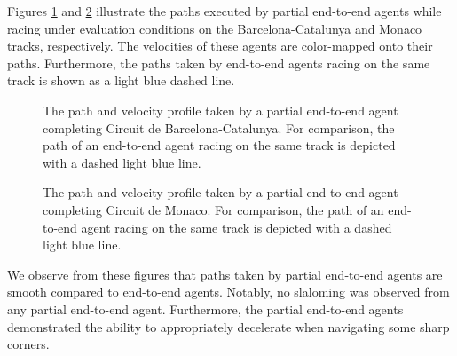 Figures \ref{fig:esp_eval} and \ref{fig:mco_eval} illustrate the paths executed by partial end-to-end agents while racing under evaluation conditions on the Barcelona-Catalunya and Monaco tracks, respectively.
The velocities of these agents are color-mapped onto their paths.
Furthermore, the paths taken by end-to-end agents racing on the same track is shown as a light blue dashed line.
\begin{figure}[htb!]
    \centering
    
    \caption[The path and velocity profile taken by a partial end-to-end agent completing Circuit de Barcelona-Catalunya]{The path and velocity profile taken by a partial end-to-end agent completing Circuit de Barcelona-Catalunya. For comparison, the path of an end-to-end agent racing on the same track is depicted with a dashed light blue line.}
    \label{fig:esp_eval}
\end{figure}
\begin{figure}[htb!]
    \centering
    
    \caption[The path and velocity profile taken by a partial end-to-end agent completing Circuit de Monaco]{The path and velocity profile taken by a partial end-to-end agent completing Circuit de Monaco. For comparison, the path of an end-to-end agent racing on the same track is depicted with a dashed light blue line.}
    \label{fig:mco_eval}
\end{figure}
We observe from these figures that paths taken by partial end-to-end agents are smooth compared to end-to-end agents.
Notably, no slaloming was observed from any partial end-to-end agent.
Furthermore, the partial end-to-end agents demonstrated the ability to appropriately decelerate when navigating some sharp corners.

%     

%     



